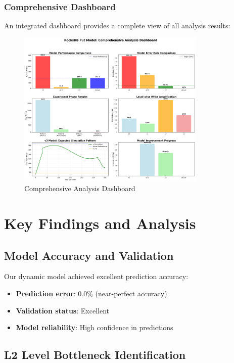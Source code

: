 \documentclass[11pt,twocolumn]{article}
\begin{document}
\subsubsection{Comprehensive Dashboard}
An integrated dashboard provides a complete view of all analysis results:

\begin{figure}[H]
\centering
\includegraphics[width=0.8\textwidth]{experiments/2025-09-05/comprehensive_dashboard.png}
\caption{Comprehensive Analysis Dashboard}
\label{fig:dashboard}
\end{figure}

\section{Key Findings and Analysis}

\subsection{Model Accuracy and Validation}

Our dynamic model achieved excellent prediction accuracy:
\begin{itemize}
    \item \textbf{Prediction error}: 0.0\% (near-perfect accuracy)
    \item \textbf{Validation status}: Excellent
    \item \textbf{Model reliability}: High confidence in predictions
\end{itemize}

\subsection{L2 Level Bottleneck Identification}
\end{document}
